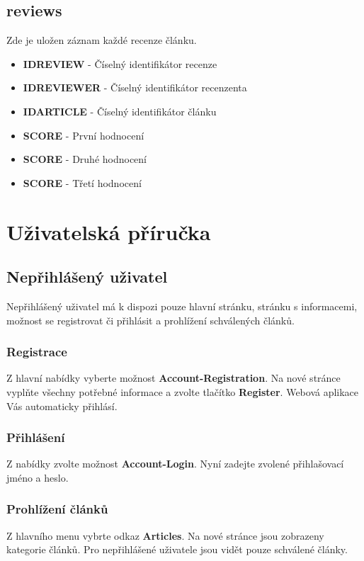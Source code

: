 \documentclass[czech,SP]{thesiskiv}
\begin{document}
\section{reviews}
Zde je uložen záznam každé recenze článku.

\begin{itemize}
\item \textbf{ID\textunderscore REVIEW} - Číselný identifikátor recenze
\item \textbf{ID\textunderscore REVIEWER} - Číselný identifikátor recenzenta
\item \textbf{ID\textunderscore ARTICLE} - Číselný identifikátor článku
\item \textbf{SCORE} - První hodnocení
\item \textbf{SCORE} - Druhé hodnocení
\item \textbf{SCORE} - Třetí hodnocení
\end{itemize}

%
%
\chapter{Uživatelská příručka}

\section{Nepřihlášený uživatel}
Nepřihlášený uživatel má k dispozi pouze hlavní stránku, stránku s informacemi, možnost se registrovat či přihlásit
a prohlížení schválených článků.
\subsection{Registrace}
Z hlavní nabídky vyberte možnost \textbf{Account-Registration}. Na nové stránce vyplňte všechny potřebné informace
a zvolte tlačítko \textbf{Register}. Webová aplikace Vás automaticky přihlásí.
\subsection{Přihlášení}
Z nabídky zvolte možnost \textbf{Account-Login}. Nyní zadejte zvolené přihlašovací jméno a heslo.
\subsection{Prohlížení článků}
Z hlavního menu vybrte odkaz \textbf{Articles}. Na nové stránce jsou zobrazeny kategorie článků. Pro nepřihlášené uživatele
jsou vidět pouze schválené články.
\end{document}
